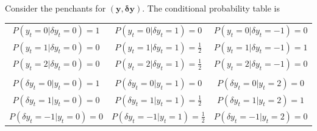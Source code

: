 \documentclass[a4paper,11pt]{article}
\begin{document}
Consider the penchants for $(\mathbf{ y},\mathbf{\delta y})$.  The conditional probability table is
\begin{center}
\begin{tabular}{c|c|c}
$P(y_t=0 | \delta y_t = 0) = 1$ &
$P(y_t=0 | \delta y_t = 1) = 0$ &
$P(y_t=0 | \delta y_t = -1) = 0$ \\

$P(y_t=1 | \delta y_t = 0) = 0$ &
$P(y_t=1 | \delta y_t = 1) = \frac{1}{2}$ &
$P(y_t=1 | \delta y_t = -1) = 1$ \\

$P(y_t=2 | \delta y_t = 0) = 0$ &
$P(y_t=2 | \delta y_t = 1) = \frac{1}{2}$ &
$P(y_t=2 | \delta y_t = -1) = 0$ \\
\hline \\
$P(\delta y_t=0 | y_t = 0) = 1$ &
$P(\delta y_t=0 | y_t = 1) = 0$ &
$P(\delta y_t=0 | y_t = 2) = 0$ \\

$P(\delta y_t=1 | y_t = 0) = 0$ &
$P(\delta y_t=1 | y_t = 1) = \frac{1}{2}$ &
$P(\delta y_t=1 | y_t = 2) = 1$ \\

$P(\delta y_t=-1 | y_t = 0) = 0$ &
$P(\delta y_t=-1 | y_t = 1) = \frac{1}{2}$ &
$P(\delta y_t=-1 | y_t = 2) = 0$ \\
\end{tabular}
\end{center}
\end{document}
